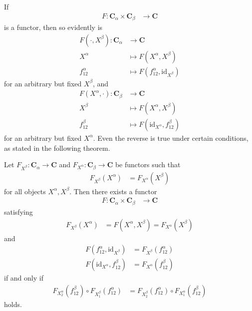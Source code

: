 If
\begin{align*}
  F
  \colon
  \mathbf{C}_{\alpha}
  \times
  \mathbf{C}_{\beta}
  &\rightarrow
  \mathbf{C}
\end{align*}
is a functor, then so evidently is
\begin{align*}
  F(\cdot,X^{\beta})
  \colon
  \mathbf{C}_{\alpha}
  &\rightarrow
  \mathbf{C}
  \\
  X^{\alpha}
  &\mapsto
  F(X^{\alpha},X^{\beta})
  \\
  f_{12}^{\alpha}
  &\mapsto
  F(f_{12}^{\alpha},\mathrm{id}_{X^{\beta}})
\end{align*}
for an arbitrary but fixed $X^{\beta}$, and
\begin{align*}
  F(X^{\alpha},\cdot)
  \colon
  \mathbf{C}_{\beta}
  &\rightarrow
  \mathbf{C}
  \\
  X^{\beta}
  &\mapsto
  F(X^{\alpha},X^{\beta})
  \\
  f_{12}^{\beta}
  &\mapsto
  F(\mathrm{id}_{X^{\alpha}},f_{12}^{\beta})
\end{align*}
for an arbitrary but fixed $X^{\alpha}$.
Even the reverse is true under certain conditions, as stated in the following theorem.
\\
\begin{thm}
\label{thm:bifuncconstr}
Let $F_{X^{\beta}} \colon \mathbf{C}_{\alpha} \rightarrow \mathbf{C}$ and $F_{X^{\alpha}} \colon \mathbf{C}_{\beta} \rightarrow \mathbf{C}$ be functors such that
\begin{align*}
  F_{X^{\beta}}(X^{\alpha})
  &=
  F_{X^{\alpha}}(X^{\beta})
\end{align*}
for all objects $X^{\alpha},X^{\beta}$.
Then there exists a functor
\begin{align*}
  F
  \colon
  \mathbf{C}_{\alpha}
  \times
  \mathbf{C}_{\beta}
  &\rightarrow
  \mathbf{C}
\end{align*}
satisfying
\begin{align*}
  F_{X^{\beta}}(X^{\alpha})
  &=
  F(X^{\alpha},X^{\beta})
  =
  F_{X^{\alpha}}(X^{\beta})
\end{align*}
and
\begin{align*}
  F
  \left(
    f_{12}^{\alpha},\mathrm{id}_{X^{\beta}}
  \right)
  &=
  F_{X^{\beta}}(f_{12}^{\alpha})
  \\
  F
  \left(
    \mathrm{id}_{X^{\alpha}},f_{12}^{\beta}
  \right)
  &=
  F_{X^{\alpha}}(f_{12}^{\beta})
\end{align*}
if and only if
\begin{align*}
  F_{X_{2}^{\alpha}}(f_{12}^{\beta})
  \circ
  F_{X_{1}^{\beta}}(f_{12}^{\alpha})
  &=
  F_{X_{2}^{\beta}}(f_{12}^{\alpha})
  \circ
  F_{X_{1}^{\alpha}}(f_{12}^{\beta})
\end{align*}
holds.
\end{thm}
